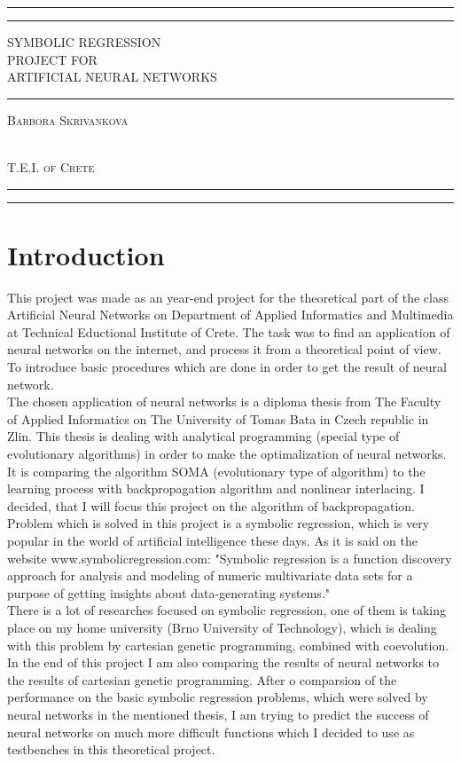 \documentclass[a4paper,oneside,onecolumn,11pt]{report}
\newcommand*{\titleAT}{\begingroup %
\newlength{\drop} %
\drop=0.1\textheight %

\rule{\textwidth}{1pt}\par %
\vspace{2pt}\vspace{-\baselineskip} %
\rule{\textwidth}{0.4pt}\par %

\vspace{\drop} %
\centering %
\textcolor{}{ %
{\Huge SYMBOLIC REGRESSION}\\[1.0\baselineskip] %
{PROJECT FOR}\\[0.75\baselineskip] %
{\Large ARTIFICIAL NEURAL NETWORKS}} %

\vspace{0.25\drop} %
\rule{0.3\textwidth}{0.4pt}\par %
\vspace{\drop} %

{\Large \textsc{Barbora Skrivankova}}\par %

\vfill %
{\large \textcolor{}{\plogo}}\\[0.5\baselineskip] %
{\large \textsc{T.E.I. of Crete}}\par %

\vspace*{\drop} %

\rule{\textwidth}{0.4pt}\par %
\vspace{2pt}\vspace{-\baselineskip} %
\rule{\textwidth}{1pt}\par %

\endgroup}
\begin{document}
\titleAT
\thispagestyle{empty}
\tableofcontents

\chapter{Introduction}
	This project was made as an year-end project for the theoretical part of the class Artificial
	Neural Networks on Department of Applied Informatics and Multimedia at Technical Eductional 
	Institute of Crete. The task was to find an application of neural networks on the internet, 
	and process it from a theoretical point of view. To introduce basic procedures which are
	done in order to get the result of neural network. \\

	The chosen application of neural networks is a diploma thesis from The Faculty of Applied Informatics
	on The University of Tomas Bata in Czech republic in Zlin. This thesis is dealing with analytical
	programming (special type of evolutionary algorithms) in order to make the optimalization of neural
	networks. It is comparing the algorithm SOMA (evolutionary type of algorithm) to the learning 
	process with backpropagation algorithm and nonlinear interlacing. I decided, that I will focus
	this project on the algorithm of backpropagation.\\

	Problem which is solved in this project is a symbolic regression, which is very popular in the world
	of artificial intelligence these days. As it is said on the website www.symbolicregression.com:
	"Symbolic regression is a function discovery approach for analysis and modeling of numeric multivariate 
	data sets for a purpose of getting insights about data-generating systems."\\

	There is a lot of researches focused on symbolic regression, one of them is taking place on my
	home university (Brno University of Technology), which is dealing with this problem by cartesian
	genetic programming, combined with coevolution. In the end of this project I am also comparing
	the results of neural networks to the results of cartesian genetic programming. After o comparsion
	of the performance on the basic symbolic regression problems, which were solved by neural networks
	in the mentioned thesis, I am trying to predict the success of neural networks on much more 
	difficult functions which I decided to use as testbenches in this theoretical project. \\
\end{document}
